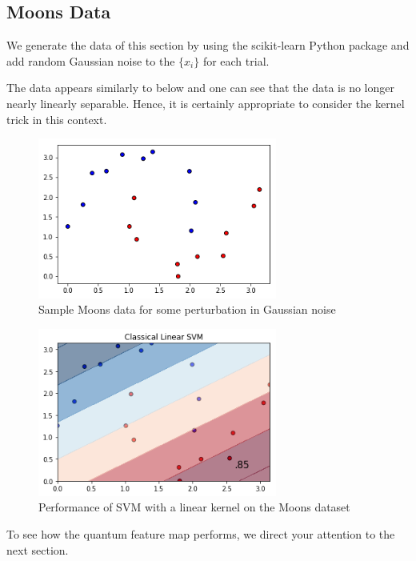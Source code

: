 \documentclass[main.tex]{subfiles}
\begin{document}
\subsection{Moons Data}
\label{sec:moon}

We generate the data of this section by using the scikit-learn Python package and add random Gaussian noise to the $\{x_i\}$ for each trial.

The data appears similarly to below and one can see that the data is no longer nearly linearly separable. Hence, it is certainly appropriate to consider the kernel trick in this context.

\begin{figure}[H]
\centering
\includegraphics[width=0.7\textwidth]{images/moons_data}
\caption{Sample Moons data for some perturbation in Gaussian noise}
\end{figure}

\begin{figure}[H]
\centering
\includegraphics[width=0.7\textwidth]{images/moons_linear_svm}
\caption{Performance of SVM with a linear kernel on the Moons dataset}
\end{figure}

To see how the quantum feature map performs, we direct your attention to the next section.
\end{document}
